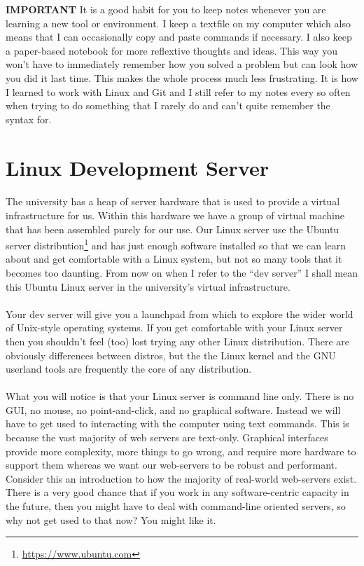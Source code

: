 \documentclass[12pt, a4paper, oneside]{book}
\begin{document}
\begin{framed}
\textbf{IMPORTANT} It is a good habit for you to keep notes whenever you are learning a new tool or environment. I keep a textfile on my computer which also means that I can occasionally copy and paste commands if necessary. I also keep a paper-based notebook for more reflextive thoughts and ideas. This way you won't have to immediately remember how you solved a problem but can look how you did it last time. This makes the whole process much less frustrating. It is how I learned to work with Linux and Git and I still refer to my notes every so often when trying to do something that I rarely do and can't quite remember the syntax for.
\end{framed}


\section{Linux Development Server}
\label{linux}
\paragraph{} The university has a heap of server hardware that is used to provide a virtual infrastructure for us. Within this hardware we have a group of virtual machine that has been assembled purely for our use. Our Linux server use the Ubuntu server distribution\footnote{\url{https://www.ubuntu.com}} and has just enough software installed so that we can learn about and get comfortable with a Linux system, but not so many tools that it becomes too daunting. From now on when I refer to the ``dev server'' I shall mean this Ubuntu Linux server in the university's virtual infrastructure.

\paragraph{} Your dev server will give you a launchpad from which to explore the wider world of Unix-style operating systems. If you get comfortable with your Linux server then you shouldn't feel (too) lost trying any other Linux distribution. There are obviously differences between distros, but the the Linux kernel and the GNU userland tools are frequently the core of any distribution.

\paragraph{} What you will notice is that your Linux server is command line only. There is no GUI, no mouse, no point-and-click, and no graphical software. Instead we will have to get used to interacting with the computer using text commands. This is because the vast majority of web servers are text-only. Graphical interfaces provide more complexity, more things to go wrong, and require more hardware to support them whereas we want our web-servers to be robust and performant. Consider this an introduction to how the majority of real-world web-servers exist. There is a very good chance that if you work in any software-centric capacity in the future, then you might have to deal with command-line oriented servers, so why not get used to that now? You might like it.
\end{document}
